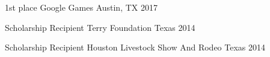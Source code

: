 

\begin{cvhonors}

  \cvhonor
    {1st place} %
    {Google Games} %
    {Austin, TX} %
    {2017} %

  \cvhonor
    {Scholarship Recipient} %
    {Terry Foundation} %
    {Texas} %
    {2014} %

  \cvhonor
    {Scholarship Recipient} %
    {Houston Livestock Show And Rodeo} %
    {Texas} %
    {2014} %

\end{cvhonors}
